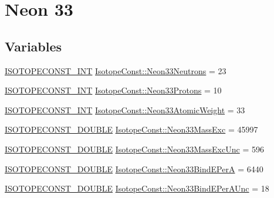 \hypertarget{group___isotope_const-_neon-_ne33}{}\section{Neon 33}
\label{group___isotope_const-_neon-_ne33}
\subsection*{Variables}
\begin{DoxyCompactItemize}
\item 
\mbox{\hyperlink{group___isotope_const-_macros_ga5f18360b3e99483a35c32d789e62621c}{I\+S\+O\+T\+O\+P\+E\+C\+O\+N\+S\+T\+\_\+\+I\+NT}} \mbox{\hyperlink{group___isotope_const-_neon-_ne33_gaafbc62e2e15d534ffdb24d0a92e7b3b6}{Isotope\+Const\+::\+Neon33\+Neutrons}} = 23
\item 
\mbox{\hyperlink{group___isotope_const-_macros_ga5f18360b3e99483a35c32d789e62621c}{I\+S\+O\+T\+O\+P\+E\+C\+O\+N\+S\+T\+\_\+\+I\+NT}} \mbox{\hyperlink{group___isotope_const-_neon-_ne33_ga86a8d0c919ff1e6dee6f1a3b2af30a24}{Isotope\+Const\+::\+Neon33\+Protons}} = 10
\item 
\mbox{\hyperlink{group___isotope_const-_macros_ga5f18360b3e99483a35c32d789e62621c}{I\+S\+O\+T\+O\+P\+E\+C\+O\+N\+S\+T\+\_\+\+I\+NT}} \mbox{\hyperlink{group___isotope_const-_neon-_ne33_ga6c977787cbf62aa63bbeb7d6d676a5e8}{Isotope\+Const\+::\+Neon33\+Atomic\+Weight}} = 33
\item 
\mbox{\hyperlink{group___isotope_const-_macros_ga8f45a7272ce02c0b4c65c44636ed719a}{I\+S\+O\+T\+O\+P\+E\+C\+O\+N\+S\+T\+\_\+\+D\+O\+U\+B\+LE}} \mbox{\hyperlink{group___isotope_const-_neon-_ne33_ga2a1142284ade61e9b294294902edfd26}{Isotope\+Const\+::\+Neon33\+Mass\+Exc}} = 45997
\item 
\mbox{\hyperlink{group___isotope_const-_macros_ga8f45a7272ce02c0b4c65c44636ed719a}{I\+S\+O\+T\+O\+P\+E\+C\+O\+N\+S\+T\+\_\+\+D\+O\+U\+B\+LE}} \mbox{\hyperlink{group___isotope_const-_neon-_ne33_ga92d7364b4272252796ed4b6d94128129}{Isotope\+Const\+::\+Neon33\+Mass\+Exc\+Unc}} = 596
\item 
\mbox{\hyperlink{group___isotope_const-_macros_ga8f45a7272ce02c0b4c65c44636ed719a}{I\+S\+O\+T\+O\+P\+E\+C\+O\+N\+S\+T\+\_\+\+D\+O\+U\+B\+LE}} \mbox{\hyperlink{group___isotope_const-_neon-_ne33_ga8b512f5fe624d2157e9384713e77af8e}{Isotope\+Const\+::\+Neon33\+Bind\+E\+PerA}} = 6440
\item 
\mbox{\hyperlink{group___isotope_const-_macros_ga8f45a7272ce02c0b4c65c44636ed719a}{I\+S\+O\+T\+O\+P\+E\+C\+O\+N\+S\+T\+\_\+\+D\+O\+U\+B\+LE}} \mbox{\hyperlink{group___isotope_const-_neon-_ne33_ga7453c551ad227923fb7df389d00a89f8}{Isotope\+Const\+::\+Neon33\+Bind\+E\+Per\+A\+Unc}} = 18

\end{DoxyCompactItemize}
